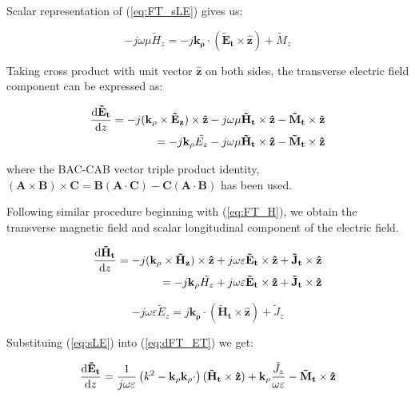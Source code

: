 \documentclass[11pt]{article}
\newcommand{\v}[1]{\mathbf{#1}} %
\newcommand{\t}[1]{\tilde{#1}} %
\renewcommand{\w}{\omega}  %
\renewcommand{\e}{\varepsilon}  %
\renewcommand{\u}{\mu}  %
\renewcommand{\p}{\rho}  %
\begin{document}
  Scalar representation of (\ref{eq:FT_sLE}) gives us:

  \begin{equation}
    -j \w \u \t{H}_z =
    -j \v{k_{\p}} \cdot (\v{\t{E}_t} \times \v{\hat{z}}) + {\t{M}_z}
    \label{eq:sLH}
  \end{equation}

  Taking cross product with unit vector $\v{\hat{z}}$ on both sides, the transverse electric field component can be expressed as:

  \begin{equation}
    \begin{split}
      \dv{\v{\t{E}_t}}{z} = -j (\v{k_{\p}} \times \v{\t{E}_z}) \times \v{\hat{z}}
      -j \w \u \v{\t{H}_t} \times \v{\hat{z}}  -
      \v{\t{M}_t} \times \v{\hat{z}} \\
      = -j \v{k_{\p}} \t{{E}_z} -j \w \u \v{\t{H}_t} \times \v{\hat{z}}  -
      \v{\t{M}_t} \times \v{\hat{z}}
    \end{split}
    \label{eq:dFT_ET}
  \end{equation}

  where the BAC-CAB vector triple product identity, $(\v{A} \times \v{B})\times\v{C} = \v{B}(\v{A} \cdot \v{C}) - \v{C}(\v{A} \cdot \v{B})$ has been used.

  Following similar procedure beginning with (\ref{eq:FT_H}), we obtain the transverse magnetic field and scalar longitudinal component of the electric field.

  \begin{equation}
    \begin{split}
      \dv{\v{\t{H}_t}}{z} = -j (\v{k_{\p}} \times \v{\t{H}_z}) \times \v{\hat{z}}
      + j \w \e \v{\t{E}_t} \times \v{\hat{z}} +
      \v{\t{J}_t} \times \v{\hat{z}} \\
      = -j \v{k_{\p}} \t{{H}_z} + j \w \e \v{\t{E}_t} \times \v{\hat{z}}  +
      \v{\t{J}_t} \times \v{\hat{z}}
    \end{split}
    \label{eq:dFT_HT}
  \end{equation}

  \begin{equation}
    -j \w \e \t{E}_z =
    j \v{k_{\p}} \cdot (\v{\t{H}_t} \times \v{\hat{z}}) + {\t{J}_z}
    \label{eq:sLE}
  \end{equation}

  Substituing (\ref{eq:sLE}) into (\ref{eq:dFT_ET}) we get:

  \begin{equation}
    \dv{\v{\t{E}_t}}{z} =
    \frac{1}{j \w \e} \left( k^2 - \v{k_{\p}}\v{k_{\p}} \cdot \right) (\v{\t{H}_t} \times \v{\hat{z}}) + \v{k_{\p}} \frac{\t{J}_z}{\w \e} - \v{\t{M}_t}
    \times \v{\hat{z}}
    \label{eq:Et}
  \end{equation}
\end{document}
